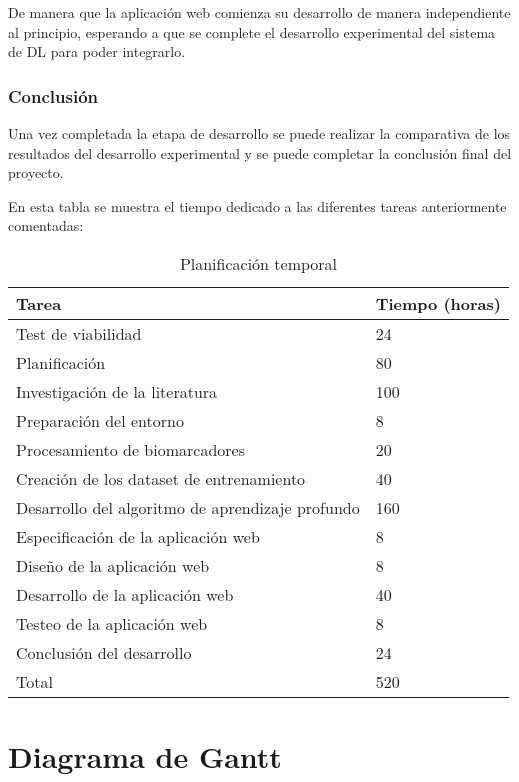 De manera que la aplicación web comienza su desarrollo de manera independiente al principio, esperando a que se complete
el desarrollo experimental del sistema de DL para poder integrarlo.

\subsubsection{Conclusión}
Una vez completada la etapa de desarrollo se puede realizar la comparativa de los resultados del desarrollo experimental
y se puede completar la conclusión final del proyecto.

En esta tabla se muestra el tiempo dedicado a las diferentes tareas anteriormente comentadas:

\begin{table}[H]
    \centering
    \begin{tabular}{|l|l|}
        \hline
        \textbf{Tarea} & \textbf{Tiempo (horas)} \\
        \hline
        Test de viabilidad & 24 \\
        \hline
        Planificación & 80 \\
        \hline
        Investigación de la literatura & 100 \\
        \hline
        Preparación del entorno & 8 \\
        \hline
        Procesamiento de biomarcadores & 20 \\
        \hline
        Creación de los dataset de entrenamiento & 40 \\
        \hline
        Desarrollo del algoritmo de aprendizaje profundo & 160 \\
        \hline
        Especificación de la aplicación web & 8 \\
        \hline
        Diseño de la aplicación web & 8 \\
        \hline
        Desarrollo de la aplicación web & 40 \\
        \hline
        Testeo de la aplicación web & 8 \\
        \hline
        Conclusión del desarrollo & 24 \\
        \hline
        \hline
        Total & 520 \\
        \hline
    \end{tabular}
    \caption{Planificación temporal}
    \label{tab:tabla_planificacion_temporal}
\end{table}

\section{Diagrama de Gantt}\label{sec:diagrama-de-gantt}



